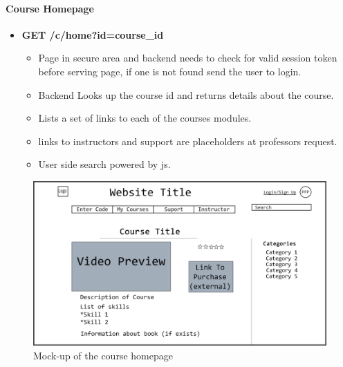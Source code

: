 \documentclass{article}
\begin{document}
\paragraph{Course Homepage}
\vspace{\baselineskip}
\begin{itemize}
    \item \textbf{GET /c/home?id=course\_id}
        \begin{itemize}
        \item Page in secure area and backend needs to check for valid session
            token before serving page, if one is not found send the user to
                login.
        \item Backend Looks up the course id and returns details about the course.
        \item Lists a set of links to each of the courses modules.
        \item links to instructors and support are placeholders at professors request.
        \item User side search powered by js.
    \end{itemize}
\end{itemize}
\begin{figure}[h!]
    \caption{Mock-up of the course homepage}
    \includegraphics[width=\textwidth]{course_preview}
\end{figure}

\newpage
\end{document}
